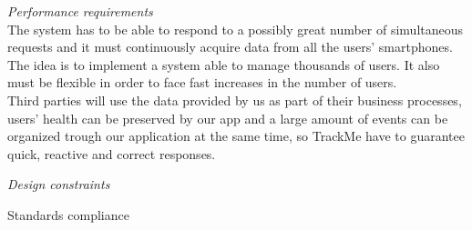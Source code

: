 \documentclass{article}
\begin{document}
\begin{legal}
\begin{legal}
		\item \textit{Performance requirements}\\
			{\normalfont
The system has to be able to respond to a possibly great number of simultaneous requests and it must continuously acquire data from all the users' smartphones. The idea is to implement a system able to manage thousands of users. It also must be flexible in order to face fast increases in the number of users.\\
Third parties will use the data provided by us as part of their business processes, users' health can be preserved by our app and a large amount of events can be organized trough our application at the same time, so TrackMe have to guarantee quick, reactive and correct responses.
			}
		\item \textit{Design constraints}\\
			\begin{legal}
			\item Standards compliance\\
			\begin{itemize}
			\end{itemize}
	

\end{legal}
\end{legal}
\end{legal}
\end{document}
